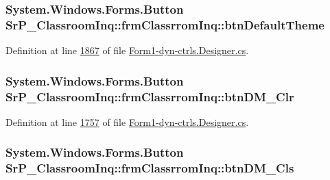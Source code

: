 \hypertarget{class_sr_p___classroom_inq_1_1frm_classrrom_inq_a17fc9570ddfb13b5334d6f36eb6e7800}{
\subsubsection[{btn\-Default\-Theme}]{\setlength{\rightskip}{0pt plus 5cm}\-System.\-Windows.\-Forms.\-Button {\bf \-Sr\-P\-\_\-\-Classroom\-Inq\-::frm\-Classrrom\-Inq\-::btn\-Default\-Theme}}}
\label{class_sr_p___classroom_inq_1_1frm_classrrom_inq_a17fc9570ddfb13b5334d6f36eb6e7800}


\-Definition at line \hyperlink{_form1-dyn-ctrls_8_designer_8cs_source_l01867}{1867} of file \hyperlink{_form1-dyn-ctrls_8_designer_8cs_source}{\-Form1-\/dyn-\/ctrls.\-Designer.\-cs}.

\hypertarget{class_sr_p___classroom_inq_1_1frm_classrrom_inq_a81852ce0a99da9e3b5838befcb9daedc}{
\subsubsection[{btn\-D\-M\-\_\-\-Clr}]{\setlength{\rightskip}{0pt plus 5cm}\-System.\-Windows.\-Forms.\-Button {\bf \-Sr\-P\-\_\-\-Classroom\-Inq\-::frm\-Classrrom\-Inq\-::btn\-D\-M\-\_\-\-Clr}}}
\label{class_sr_p___classroom_inq_1_1frm_classrrom_inq_a81852ce0a99da9e3b5838befcb9daedc}


\-Definition at line \hyperlink{_form1-dyn-ctrls_8_designer_8cs_source_l01757}{1757} of file \hyperlink{_form1-dyn-ctrls_8_designer_8cs_source}{\-Form1-\/dyn-\/ctrls.\-Designer.\-cs}.

\hypertarget{class_sr_p___classroom_inq_1_1frm_classrrom_inq_a2e01fdc50400702fd6df6d5d785ddb4d}{
\subsubsection[{btn\-D\-M\-\_\-\-Cls}]{\setlength{\rightskip}{0pt plus 5cm}\-System.\-Windows.\-Forms.\-Button {\bf \-Sr\-P\-\_\-\-Classroom\-Inq\-::frm\-Classrrom\-Inq\-::btn\-D\-M\-\_\-\-Cls}}}
\label{class_sr_p___classroom_inq_1_1frm_classrrom_inq_a2e01fdc50400702fd6df6d5d785ddb4d}


